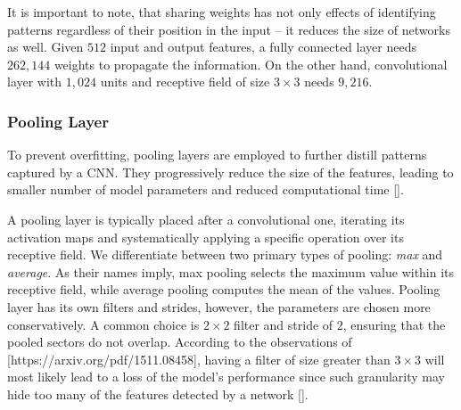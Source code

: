 It is important to note, that sharing weights has not only effects of identifying patterns regardless of their position in the input -- it reduces the size of networks as well.
Given $512$ input and output features, a fully connected layer needs $262,144$ weights to propagate the information.
On the other hand, convolutional layer with $1,024$ units and receptive field of size $3 \times 3$ needs $9,216$.

\subsubsection{Pooling Layer}

To prevent overfitting, pooling layers are employed to further distill patterns captured by a CNN.
They progressively reduce the size of the features, leading to smaller number of model parameters and reduced computational time [].

A pooling layer is typically placed after a convolutional one, iterating its activation maps and systematically applying a specific operation over its receptive field.
We differentiate between two primary types of pooling: \emph{max} and \emph{average}.
As their names imply, max pooling selects the maximum value within its receptive field, while average pooling computes the mean of the values.
Pooling layer has its own filters and strides, however, the parameters are chosen more conservatively.
A common choice is $2 \times 2$ filter and stride of $2$, ensuring that the pooled sectors do not overlap.
According to the observations of [https://arxiv.org/pdf/1511.08458], having a filter of size greater than $3 \times 3$ will most likely lead to a loss of the model's performance since such granularity may hide too many of the features detected by a network [].

